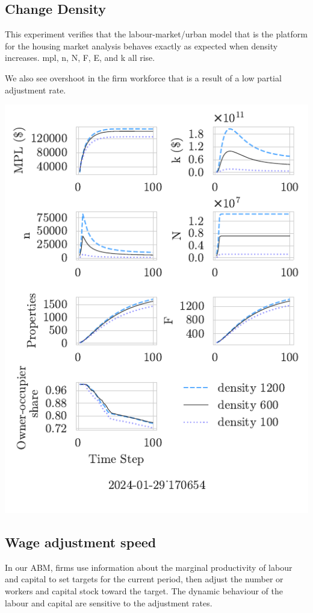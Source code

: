 \documentclass{article}
\begin{document}
 \subsection{Change Density}
 This experiment verifies that the labour-market/urban model that is the platform for the housing market analysis behaves exactly as expected when density increases. mpl, n, N, F, E, and k all rise. 

 We also see overshoot in the firm workforce that is a result of a low partial adjustment rate.

 

 \includegraphics[]{fig/Analysis/density-2024-01-29_170654.pdf}


\newpage %
\subsection{Wage  adjustment  speed} 
In our ABM, firms use information about the  marginal productivity of labour and capital to set targets for the current period, then adjust the number or workers and capital stock toward the target. The dynamic behaviour of the labour and capital are sensitive to the adjustment rates. 
\end{document}
